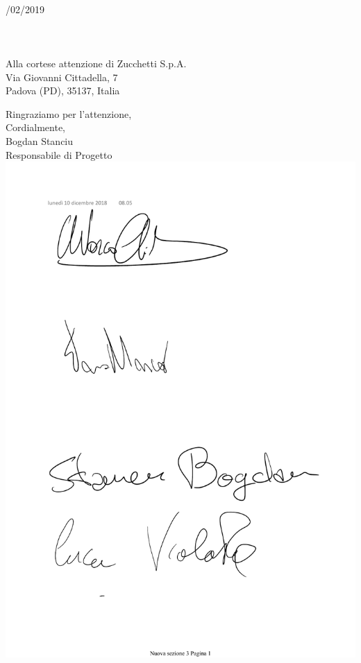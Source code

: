 \documentclass[11pt, a4paper]{letter} %
\begin{document}
\begin{letter}{
	\-\\/02/2019
	\-\\\-\\\-\\\-\\
	Alla cortese attenzione di Zucchetti S.p.A. \\
	Via Giovanni Cittadella, 7\\
	Padova (PD), 35137, Italia
}
\closing{Ringraziamo per l'attenzione,\\
Cordialmente,\\
Bogdan Stanciu\\
Responsabile di Progetto
\includegraphics[scale=0.4]{images/BogdanStanciu.pdf}} 





\end{letter}
\end{document}

